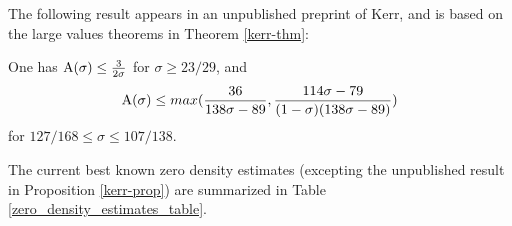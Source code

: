 The following result appears in an unpublished preprint of Kerr, and is based on the large values theorems in Theorem \ref{kerr-thm}:

\begin{proposition}\label{kerr-prop}\cite[Theorems 6, 7]{kerr} One has $\mathrm{A}(\sigma) \leq \frac{3}{2\sigma}$ for $\sigma \geq 23/29$, and
$$\mathrm{A}(\sigma) \leq \\max( \frac{36}{138\sigma-89}, \frac{114\sigma-79}{(1-\sigma)(138\sigma-89)} )$$
for $127/168 \leq \sigma \leq 107/138$.
\end{proposition}

The current best known zero density estimates (excepting the unpublished result in Proposition \ref{kerr-prop}) are summarized in Table \ref{zero_density_estimates_table}.

